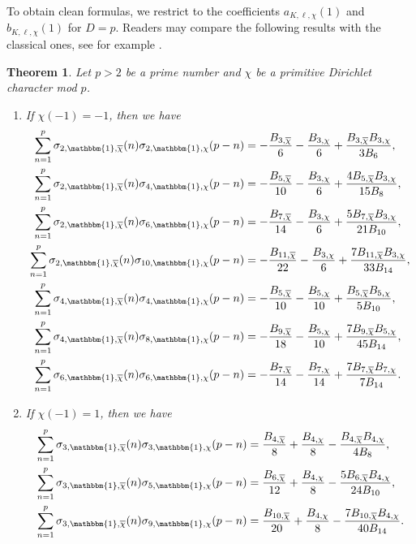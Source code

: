 \documentclass[11pt,letterpaper,reqno]{amsart}
\numberwithin{figure}{section}
\numberwithin{table}{section}
\theoremstyle{definition}
\theoremstyle{plain}
\newtheorem{theorem}{Theorem}[section]
\theoremstyle{definition}
\theoremstyle{definition}
\theoremstyle{remark}
\numberwithin{equation}{section}
\theoremstyle{remark}
\begin{document}
To obtain clean formulas,  we restrict to the coefficients $a_{K,\ell,\chi}(1)$ and $b_{K,\ell,\chi}(1)$ for $D=p$. Readers may compare the following results with the classical ones, see for example \cite{convolutionsum}.
\begin{theorem}\label{thm:a=0}
    Let $p>2$ be a prime number and  $\chi$ be a primitive Dirichlet character mod $p$. 
    \begin{enumerate} 
    \item If $\chi(-1)=-1$, then we have 
    \begin{align*}
       \sum_{n=1}^{p}\sigma_{2,\mathbbm{1},\overline{\chi}}(n)\sigma_{2,\mathbbm{1},\chi}(p-n)&= -\frac{B_{3,\overline{\chi}}}{6}-\frac{B_{3,\chi}}{6}+\frac{B_{3,\overline{\chi}}B_{3,\chi}}{3B_6},\\\sum_{n=1}^{p}\sigma_{2,\mathbbm{1},\overline{\chi}}(n)\sigma_{4,\mathbbm{1},\chi}(p-n)&=-\frac{B_{5,\overline{\chi}}}{10}-\frac{B_{3,\chi}}{6}+\frac{4B_{5,\overline{\chi}}B_{3,\chi}}{15B_8},\\\sum_{n=1}^{p}\sigma_{2,\mathbbm{1},\overline{\chi}}(n)\sigma_{6,\mathbbm{1},\chi}(p-n)&=-\frac{B_{7,\overline{\chi}}}{14}-\frac{B_{3,\chi}}{6}+\frac{5B_{7,\overline{\chi}}B_{3,\chi}}{21B_{10}},\\\sum_{n=1}^{p}\sigma_{2,\mathbbm{1},\overline{\chi}}(n)\sigma_{10,\mathbbm{1},\chi}(p-n)&=-\frac{B_{11,\overline{\chi}}}{22}-\frac{B_{3,\chi}}{6}+\frac{7B_{11,\overline{\chi}}B_{3,\chi}}{33B_{14}},\\\sum_{n=1}^{p}\sigma_{4,\mathbbm{1},\overline{\chi}}(n)\sigma_{4,\mathbbm{1},\chi}(p-n)&=-\frac{B_{5,\overline{\chi}}}{10}-\frac{B_{5,\chi}}{10}+\frac{B_{5,\overline{\chi}}B_{5,\chi}}{5B_{10}},\\\sum_{n=1}^{p}\sigma_{4,\mathbbm{1},\overline{\chi}}(n)\sigma_{8,\mathbbm{1},\chi}(p-n)&=-\frac{B_{9,\overline{\chi}}}{18}-\frac{B_{5,\chi}}{10}+\frac{7B_{9,\overline{\chi}}B_{5,\chi}}{45B_{14}},\\\sum_{n=1}^{p}\sigma_{6,\mathbbm{1},\overline{\chi}}(n)\sigma_{6,\mathbbm{1},\chi}(p-n)&=-\frac{B_{7,\overline{\chi}}}{14}-\frac{B_{7,\chi}}{14}+\frac{7B_{7,\overline{\chi}}B_{7,\chi}}{7B_{14}}.
    \end{align*}
    \item If $\chi(-1)=1$, then we have
    \begin{align*}
        \sum_{n=1}^{p}\sigma_{3,\mathbbm{1},\overline{\chi}}(n)\sigma_{3,\mathbbm{1},\chi}(p-n)&=\frac{B_{4,\overline{\chi}}}{8}+\frac{B_{4,\chi}}{8}-\frac{B_{4,\overline{\chi}}B_{4,\chi}}{4B_{8}},\\    \sum_{n=1}^{p}\sigma_{3,\mathbbm{1},\overline{\chi}}(n)\sigma_{5,\mathbbm{1},\chi}(p-n)&=\frac{B_{6,\overline{\chi}}}{12}+\frac{B_{4,\chi}}{8}-\frac{5B_{6,\overline{\chi}}B_{4,\chi}}{24B_{10}},\\     \sum_{n=1}^{p}\sigma_{3,\mathbbm{1},\overline{\chi}}(n)\sigma_{9,\mathbbm{1},\chi}(p-n)&=\frac{B_{10,\overline{\chi}}}{20}+\frac{B_{4,\chi}}{8}-\frac{7B_{10,\overline{\chi}}B_{4,\chi}}{40B_{14}}.
    \end{align*}
    \end{enumerate}
\end{theorem}
\end{document}
